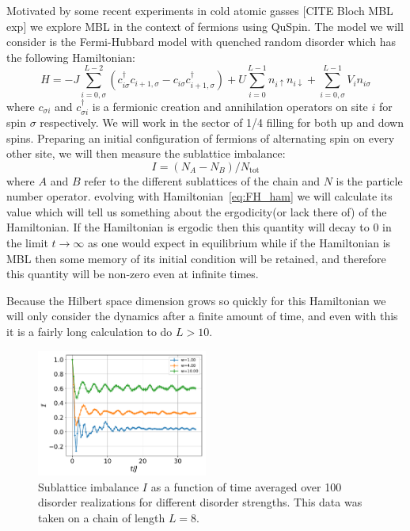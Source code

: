 \documentclass{SciPost}
\newcommand\0{\scalebox{-1}[1]{0}}
\begin{document}
Motivated by some recent experiments in cold atomic gasses [CITE Bloch MBL exp] we explore MBL in the context of fermions using QuSpin. The model we will consider is the Fermi-Hubbard model with quenched random disorder which has the following Hamiltonian:
\begin{equation}
	H = -J\sum_{i=0,\sigma}^{L-2} \left(c^\dagger_{i\sigma}c_{i+1,\sigma} - c_{i\sigma}c^\dagger_{i+1,\sigma}\right) +U\sum_{i=0}^{L-1} n_{i\uparrow }n_{i\downarrow } + \sum_{i=0,\sigma}^{L-1} V_i n_{i\sigma}\label{eq:FH_ham}
\end{equation}
where $c_{\sigma i}$ and $c^\dagger_{\sigma i}$ is a fermionic creation and annihilation operators on site $i$ for spin $\sigma$ respectively. We will work in the sector of 1/4 filling for both up and down spins. Preparing an initial configuration of fermions of alternating spin on every other site, we will then measure the sublattice imbalance:
\begin{equation}
	I = (N_A-N_B)/N_\mathrm{tot}
\end{equation}
where $A$ and $B$ refer to the different sublattices of the chain and $N$ is the particle number operator. evolving with Hamiltonian~\eqref{eq:FH_ham} we will calculate its value which will tell us something about the ergodicity(or lack there of) of the Hamiltonian. If the Hamiltonian is ergodic then this quantity will decay to $0$ in the limit $t\rightarrow\infty$ as one would expect in equilibrium while if the Hamiltonian is MBL then some memory of its initial condition will be retained, and therefore this quantity will be non-zero even at infinite times.

Because the Hilbert space dimension grows so quickly for this Hamiltonian we will only consider the dynamics after a finite amount of time, and even with this it is a fairly long calculation to do $L>10$. 

\begin{figure}[t!]
	\centering
	\includegraphics[width=0.5\textwidth]{fermion_MBL.pdf}
	\caption{Sublattice imbalance $I$ as a function of time averaged over 100 disorder realizations for different disorder strengths. This data was taken on a chain of length $L=8$.}
\end{figure}
\end{document}
